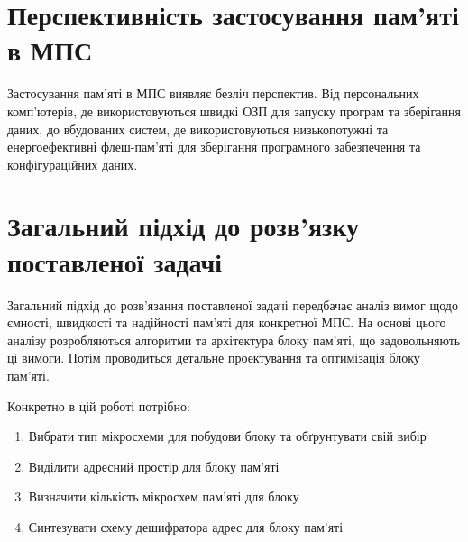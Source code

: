 \documentclass[a4paper, 12pt, oneside]{extreport}
\begin{document}
\section*{Перспективність застосування пам'яті в МПС}

Застосування пам'яті в МПС виявляє безліч перспектив. Від персональних
комп'ютерів, де використовуються швидкі ОЗП для
запуску програм та зберігання даних, до вбудованих систем, де
використовуються низькопотужні та енергоефективні флеш-пам'яті для
зберігання програмного забезпечення та конфігураційних даних.


\section*{Загальний підхід до розв'язку поставленої задачі}

Загальний підхід до розв'язання поставленої задачі передбачає
аналіз вимог щодо ємності, швидкості та надійності пам'яті для
конкретної МПС. На основі цього аналізу розробляються алгоритми та
архітектура блоку пам'яті, що задовольняють ці вимоги. Потім
проводиться детальне проектування та оптимізація блоку пам'яті.

Конкретно в цій роботі потрібно:

\begin{enumerate}
\item{Вибрати тип мікросхеми для побудови блоку та обґрунтувати свій вибір}
\item{Виділити адресний простір для блоку пам'яті}
\item{Визначити кількість мікросхем пам'яті для блоку}
\item{Синтезувати схему дешифратора адрес для блоку пам'яті}
\end{enumerate}


\end{document}
